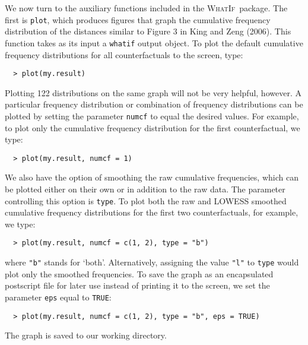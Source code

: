 \documentclass[oneside,letterpaper,titlepage]{article}
\newcommand{\WhatIf}{\textsc{WhatIf}}
\begin{document}
We now turn to the auxiliary functions included in the \WhatIf\
package.  The first is \texttt{plot}, which produces figures that
graph the cumulative frequency distribution of the distances similar
to Figure 3 in King and Zeng (2006).  This function takes as its
input a \texttt{whatif} output object.  To plot the default cumulative
frequency distributions for all counterfactuals to the screen, type:
  \begin{verbatim}
  > plot(my.result)
  \end{verbatim}
Plotting 122 distributions on the same graph will not be very helpful,
however.  A particular frequency distribution or combination of
frequency distributions can be plotted by setting the parameter
\texttt{numcf} to equal the desired values.  For example, to plot
only the cumulative frequency distribution for the first
counterfactual, we type:
  \begin{verbatim}
  > plot(my.result, numcf = 1)
  \end{verbatim}
We also have the option of smoothing the raw cumulative
frequencies, which can be plotted either on their own or in
addition to the raw data.  The parameter controlling this option is
\texttt{type}.  To plot both the raw and LOWESS smoothed cumulative
frequency distributions for the first two counterfactuals, for
example, we type:
  \begin{verbatim}
  > plot(my.result, numcf = c(1, 2), type = "b")
  \end{verbatim}
where \texttt{"b"} stands for `both'.  Alternatively, assigning the value
\texttt{"l"} to \texttt{type} would plot only the smoothed frequencies.  To
save the graph as an encapsulated postscript file for later use 
instead of printing it to the screen, we set the parameter \texttt{eps}
equal to \texttt{TRUE}:
  \begin{verbatim}
  > plot(my.result, numcf = c(1, 2), type = "b", eps = TRUE)
  \end{verbatim}
The graph is saved to our working directory.
\end{document}
